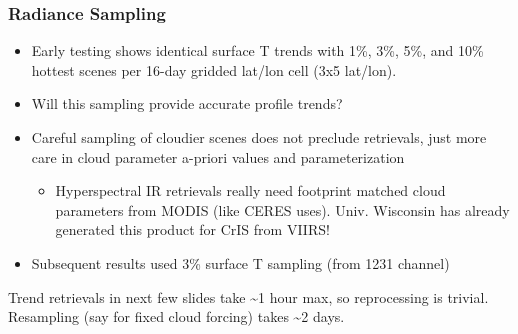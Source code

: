 \documentclass[10pt,t]{beamer}
\begin{document}
\begin{frame}
\frametitle{Radiance Sampling}  
\begin{itemize}
\item Early testing shows identical surface T trends with 1\%, 3\%, 5\%, and 10\% hottest scenes per 16-day gridded lat/lon cell (3x5 lat/lon).
\item Will this sampling provide accurate profile trends?
\item Careful sampling of cloudier scenes does not preclude retrievals, just more care in cloud parameter a-priori values and parameterization
\begin{itemize}
\item Hyperspectral IR retrievals really need footprint matched cloud parameters from MODIS (like CERES uses).  Univ. Wisconsin has already generated this product for CrIS from VIIRS!
\end{itemize}
\item Subsequent results used 3\% surface T sampling (from 1231 \wn channel)

\vspace{0.1in}
\end{itemize}

Trend retrievals in next few slides take \textasciitilde{}1 hour max, so reprocessing is trivial.\\
  \vspace{0.1in}
Resampling (say for fixed cloud forcing) takes \textasciitilde{}2 days.  
\end{frame}
\end{document}
